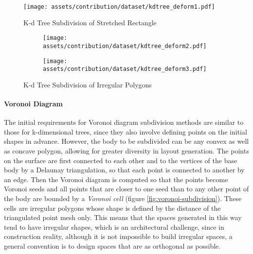 \documentclass[a4paper, 12pt]{report}
\begin{document}
\begin{figure}
\centering
\texttt{[image: assets/contribution/dataset/kdtree\_deform1.pdf]}
\caption{K-d Tree Subdivision of Stretched Rectangle}
\label{fig:k-d-tree-subdivision-of-stretched-rectangle}
\end{figure}

\begin{figure}
\centering
\begin{subfigure}{.36\textwidth}
\centering
\texttt{[image: assets/contribution/dataset/kdtree\_deform2.pdf]}
\label{fig:irregular-k-d-tree-1}
\end{subfigure}%
\begin{subfigure}{.64\textwidth}
\centering
\texttt{[image: assets/contribution/dataset/kdtree\_deform3.pdf]}
\label{fig:irregular-k-d-tree-2}
\end{subfigure}
\caption{K-d Tree Subdivision of Irregular Polygons}
\label{fig:k-d-tree-subdivision-of-irregular-polygons}
\end{figure}

\paragraph{Voronoi Diagram}\label{par:voronoi-diagram}

The initial requirements for Voronoi diagram subdivision methods are similar to those for k-dimensional trees, since they also involve defining points on the initial shapes in advance. However, the body to be subdivided can be any \gls{convex} as well as concave polygon, allowing for greater diversity in layout generation. The points on the surface are first connected to each other and to the vertices of the base body by a Delaunay triangulation, so that each point is connected to another by an edge. Then the Voronoi diagram is computed so that the points become Voronoi seeds and all points that are closer to one seed than to any other point of the body are bounded by a \textit{Voronoi cell} (figure \ref{fig:voronoi-subdivision}). These cells are irregular polygons whose shape is defined by the distance of the triangulated point mesh only. This means that the spaces generated in this way tend to have irregular shapes, which is an architectural challenge, since in construction reality, although it is not impossible to build irregular spaces, a general convention is to design spaces that are as orthogonal as possible.
\end{document}
